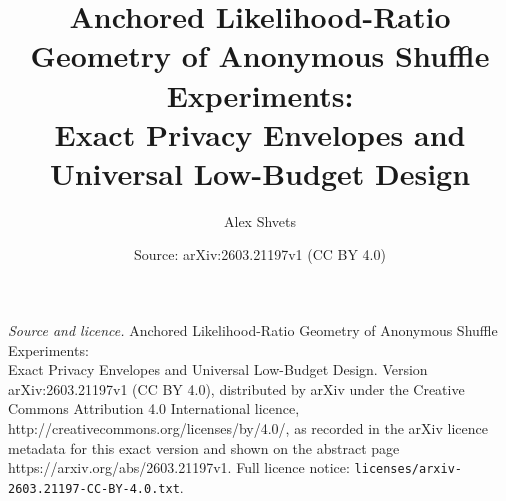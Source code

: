 \documentclass[10pt,a4paper]{amsart}
\title{Anchored Likelihood-Ratio Geometry of Anonymous Shuffle Experiments:\\Exact Privacy Envelopes and Universal Low-Budget Design}
\author{Alex Shvets}
\date{Source: arXiv:2603.21197v1 (CC BY 4.0)}
\begin{document}
\maketitle

\noindent\emph{Source and licence.} Anchored Likelihood-Ratio Geometry of Anonymous Shuffle Experiments:\\Exact Privacy Envelopes and Universal Low-Budget Design. Version arXiv:2603.21197v1 (CC BY 4.0), distributed by arXiv under the Creative Commons Attribution 4.0 International licence, http://creativecommons.org/licenses/by/4.0/, as recorded in the arXiv licence metadata for this exact version and shown on the abstract page https://arxiv.org/abs/2603.21197v1. Full licence notice: \texttt{licenses/arxiv-2603.21197-CC-BY-4.0.txt}.\par\smallskip
\end{document}
